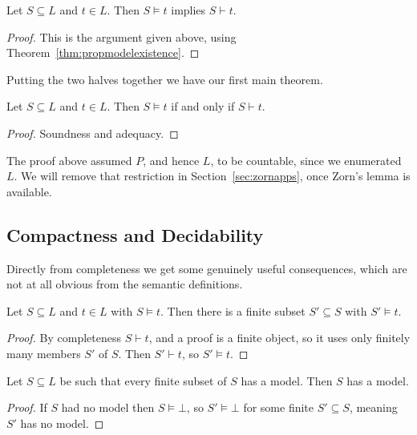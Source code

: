 \begin{corollary}[Adequacy]
  Let $S \subseteq L$ and $t \in L$. Then $S \models t$ implies $S \vdash t$.
\end{corollary}
\begin{proof}
  This is the argument given above, using Theorem~\ref{thm:propmodelexistence}.
\end{proof}

Putting the two halves together we have our first main theorem.

\begin{theorem}
  Let $S \subseteq L$ and $t \in L$. Then $S \models t$ if and only if $S \vdash t$.
\end{theorem}
\begin{proof}
  Soundness and adequacy.
\end{proof}

The proof above assumed $P$, and hence $L$, to be countable, since we enumerated $L$. We will remove that restriction in Section~\ref{sec:zornapps}, once Zorn's lemma is available.

\subsection{Compactness and Decidability}

Directly from completeness we get some genuinely useful consequences, which are not at all obvious from the semantic definitions.

\begin{theorem}
  Let $S \subseteq L$ and $t \in L$ with $S \models t$. Then there is a finite subset $S' \subseteq S$ with $S' \models t$.
\end{theorem}
\begin{proof}
  By completeness $S \vdash t$, and a proof is a finite object, so it uses only finitely many members $S'$ of $S$. Then $S' \vdash t$, so $S' \models t$.
\end{proof}

\begin{corollary}\label{cor:propcompactness}
  Let $S \subseteq L$ be such that every finite subset of $S$ has a model. Then $S$ has a model.
\end{corollary}
\begin{proof}
  If $S$ had no model then $S \models \bot$, so $S' \models \bot$ for some finite $S' \subseteq S$, meaning $S'$ has no model.
\end{proof}

